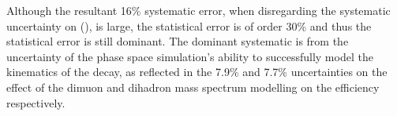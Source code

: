 Although the resultant 16\% systematic error, when disregarding the systematic uncertainty on \BF(\Lbpijpsi), is large, the statistical error is of order 30\% and thus the statistical error is still dominant. The dominant systematic is from the uncertainty of the phase space simulation's ability to successfully model the kinematics of the decay, as reflected in the 7.9\% and 7.7\% uncertainties on the effect of the dimuon and dihadron mass spectrum modelling on the efficiency respectively.





\clearpage
 
